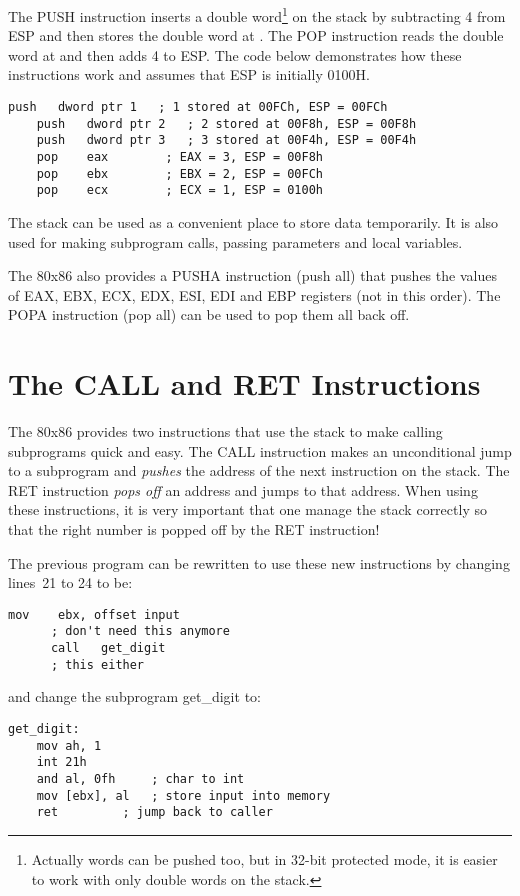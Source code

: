 The {\code PUSH} instruction inserts a double word\footnote{Actually
words can be pushed too, but in 32-bit protected mode, it is easier to
work with only double words on the stack.} on the stack by subtracting
4 from ESP and then stores the double word at {\code [ESP]}. The
{\code POP} instruction reads the double word at {\code [ESP]} and
then adds 4 to ESP. The code below demonstrates how these instructions
work and assumes that ESP is initially {\code 0100H}.
\begin{lstlisting}[language={[x86masm]Assembler}]
    push   dword ptr 1   ; 1 stored at 00FCh, ESP = 00FCh
    push   dword ptr 2   ; 2 stored at 00F8h, ESP = 00F8h
    push   dword ptr 3   ; 3 stored at 00F4h, ESP = 00F4h
    pop    eax        ; EAX = 3, ESP = 00F8h
    pop    ebx        ; EBX = 2, ESP = 00FCh
    pop    ecx        ; ECX = 1, ESP = 0100h
\end{lstlisting}

The stack can be used as a convenient place to store data temporarily. It is
also used for making subprogram calls, passing parameters and local
variables.

The 80x86 also provides a {\code PUSHA} instruction (push all) that pushes the values
of EAX, EBX, ECX, EDX, ESI, EDI and EBP registers (not in this order). The
{\code POPA} instruction (pop all) can be used to pop them all back off.

\section{The CALL and RET Instructions}
The 80x86 provides two instructions that use the stack to make calling
subprograms quick and easy. The CALL instruction makes an
unconditional jump to a subprogram and \emph{pushes} the address of
the next instruction on the stack. The RET instruction
\emph{pops off} an address and jumps to that address. When using these
instructions, it is very important that one manage the stack correctly
so that the right number is popped off by the RET instruction!

The previous program can be rewritten to use these new instructions by 
changing lines~21 to 24 to be:
\begin{lstlisting}[language={[x86masm]Assembler}, firstnumber=21]
      mov    ebx, offset input
      ; don't need this anymore
      call   get_digit
      ; this either
\end{lstlisting}
and change the subprogram {\code get\_digit} to:
\begin{lstlisting}[language={[x86masm]Assembler}]
get_digit:
    mov ah, 1
    int 21h
    and al, 0fh     ; char to int
    mov [ebx], al   ; store input into memory
    ret         ; jump back to caller
\end{lstlisting}

